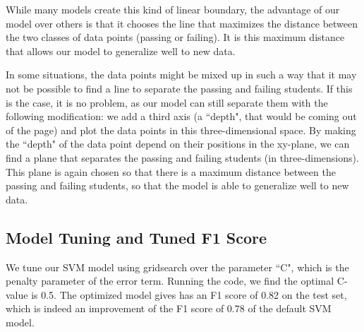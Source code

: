 \documentclass[12 pt]{article}
\numberwithin{equation}{section}
\begin{document}
While many models create this kind of linear boundary, the advantage of our model over others is that it chooses the line that maximizes the distance between the two classes of data points (passing or failing). It is this maximum distance that allows our model to generalize well to new data.

In some situations, the data points might be mixed up in such a way that it may not be possible to find a line to separate the passing and failing students. If this is the case, it is no problem, as our model can still separate them with the following modification: we add a third axis (a ``depth", that would be coming out of the page) and plot the data points in this three-dimensional space. By making the ``depth" of the data point depend on their positions in the xy-plane, we can find a plane that separates the passing and failing students (in three-dimensions). This plane is again chosen so that there is a maximum distance between the passing and failing students, so that the model is able to generalize well to new data.

\subsection{Model Tuning and Tuned F1 Score}
We tune our SVM model using gridsearch over the parameter ``C", which is the penalty parameter of the error term. Running the code, we find the optimal C-value is 0.5. The optimized model gives has an F1 score of 0.82 on the test set, which is indeed an improvement of the F1 score of 0.78 of the default SVM model.
\end{document}
